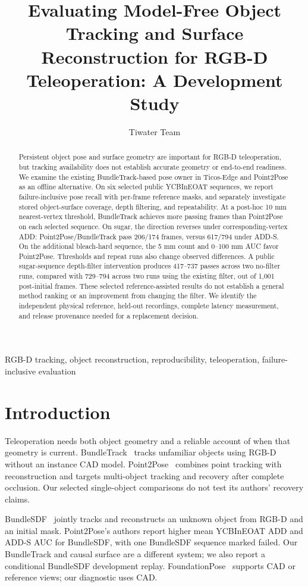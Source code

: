 \documentclass[10pt,journal]{IEEEtran}
\title{Evaluating Model-Free Object Tracking and Surface Reconstruction for RGB-D Teleoperation: A Development Study}
\author{Tiwater Team}
\begin{document}
\maketitle
\begin{abstract}
Persistent object pose and surface geometry are important for RGB-D teleoperation, but tracking availability does not establish accurate geometry or end-to-end readiness. We examine the existing BundleTrack-based pose owner in Ticos-Edge and Point2Pose as an offline alternative. On six selected public YCBInEOAT sequences, we report failure-inclusive pose recall with per-frame reference masks, and separately investigate stored object-surface coverage, depth filtering, and repeatability. At a post-hoc 10 mm nearest-vertex threshold, BundleTrack achieves more passing frames than Point2Pose on each selected sequence. On sugar, the direction reverses under corresponding-vertex ADD: Point2Pose/BundleTrack pass 206/174 frames, versus 617/794 under ADD-S. On the additional bleach-hard sequence, the 5 mm count and 0--100 mm AUC favor Point2Pose. Thresholds and repeat runs also change observed differences. A public sugar-sequence depth-filter intervention produces 417--737 passes across two no-filter runs, compared with 729--794 across two runs using the existing filter, out of 1,001 post-initial frames. These selected reference-assisted results do not establish a general method ranking or an improvement from changing the filter. We identify the independent physical reference, held-out recordings, complete latency measurement, and release provenance needed for a replacement decision.
\end{abstract}
\begin{IEEEkeywords}RGB-D tracking, object reconstruction, reproducibility, teleoperation, failure-inclusive evaluation\end{IEEEkeywords}
\section{Introduction}
Teleoperation needs both object geometry and a reliable account of when that geometry is current. BundleTrack~\cite{bundletrack} tracks unfamiliar objects using RGB-D without an instance CAD model. Point2Pose~\cite{point2pose} combines point tracking with reconstruction and targets multi-object tracking and recovery after complete occlusion. Our selected single-object comparisons do not test its authors' recovery claims.

BundleSDF~\cite{bundlesdf} jointly tracks and reconstructs an unknown object from RGB-D and an initial mask. Point2Pose's authors report higher mean YCBInEOAT ADD and ADD-S AUC for BundleSDF, with one BundleSDF sequence marked failed. Our BundleTrack and causal surface are a different system; we also report a conditional BundleSDF development replay. FoundationPose~\cite{foundationpose} supports CAD or reference views; our diagnostic uses CAD.
\end{document}
